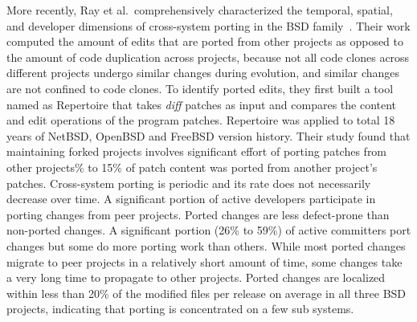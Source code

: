 More recently, Ray et al.~comprehensively characterized the temporal, spatial, and developer dimensions of cross-system porting in the BSD family~\cite{Ray2012:FSE}. Their work computed the amount of edits that are ported from other projects as opposed to the amount of code duplication across projects, because not all code clones across different projects undergo similar changes during evolution, and similar changes are not confined to code clones. To identify ported edits, they first built a tool named as Repertoire that takes {\em diff} patches as input and compares the content and edit operations of the program patches. Repertoire was applied to total 18 years of NetBSD, OpenBSD and FreeBSD version history. Their study found that maintaining forked projects involves significant effort of porting patches from other projects\% to 15\% of patch content was ported from another project's patches. Cross-system porting is periodic and its rate does not necessarily decrease over time. A significant portion of active developers participate in porting changes from peer projects. Ported changes are less defect-prone than non-ported changes. A significant portion (26\% to 59\%) of active committers port changes but some do more porting work than others. While most ported changes migrate to peer projects in a relatively short amount of time, some changes take a very long time to propagate to other projects. Ported changes are localized within less than 20\% of the modified files per release on average in all three BSD projects, indicating that porting is concentrated on a few sub systems. 


